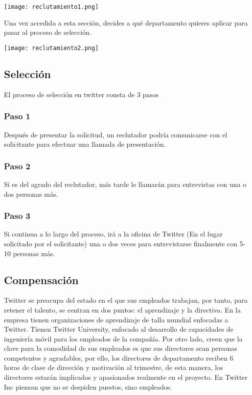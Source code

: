 \texttt{[image: reclutamiento1.png]}
\newpage

Una vez accedida a esta sección, decides a qué departamento quieres aplicar para pasar al proceso de selección.

\texttt{[image: reclutamiento2.png]}

\subsection{Selección}

El proceso de selección en twitter consta de 3 pasos

\subsubsection{Paso 1}
Después de presentar la solicitud, un reclutador podría comunicarse con el solicitante para efectuar una llamada de presentación.

\subsubsection{Paso 2}
Si es del agrado del reclutador, más tarde le llamarán para entrevistas con una o dos personas más.

\subsubsection{Paso 3}
Si continua a lo largo del proceso, irá a la oficina de Twitter (En el lugar solicitado por el solicitante) una o dos veces para entrevistarse finalmente con 5-10 personas más.

\subsection{Compensación}

Twitter se preocupa del estado en el que sus empleados trabajan, por tanto, para retener el talento, se centran en dos puntos: el aprendizaje y la directiva.
En la empresa tienen organizaciones de aprendizaje de talla mundial enfocadas a Twitter. Tienen Twitter University, enfocado al desarrollo de capacidades de ingeniería móvil para los empleados de la compañía. Por otro lado, creen que la clave para la comodidad de sus empleados es que sus directores sean personas competentes y agradables, por ello, los directores de departamento reciben 6 horas de clase de dirección y motivación al trimestre, de esta manera, los directores estarán implicados y apasionados realmente en el proyecto. En Twitter Inc piensan que no se despiden puestos, sino empleados.

